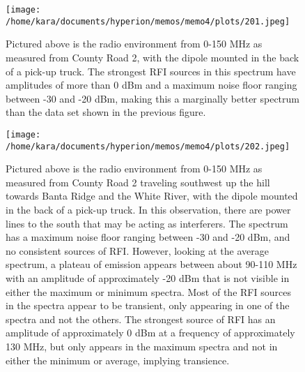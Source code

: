 \documentclass[11pt]{article}
\begin{document}
\begin{figure}[H]
    \begin{center}
    \texttt{[image: /home/kara/documents/hyperion/memos/memo4/plots/201.jpeg]}
    \end{center}
    \caption{
        Pictured above is the radio environment from 0-150 MHz as measured from 
        County Road 2, with the dipole mounted in the back of a pick-up truck.  
        The strongest RFI sources in this spectrum have amplitudes of more than 
        0 dBm and a maximum noise floor ranging between -30 and -20 dBm, making 
          this a marginally better spectrum than the data set shown in the 
          previous figure.
    }
    \label{fig:201}
\end{figure}
\begin{figure}[H]
    \begin{center}
    \texttt{[image: /home/kara/documents/hyperion/memos/memo4/plots/202.jpeg]}
    \end{center}
    \caption{
        Pictured above is the radio environment from 0-150 MHz as measured from 
        County Road 2 traveling southwest up the hill towards Banta Ridge and 
        the White River, with the dipole mounted in the back of a pick-up 
        truck.  In this observation, there are power lines to the south that 
        may be acting as interferers. The spectrum has a maximum noise floor 
        ranging between -30 and -20 dBm, and no consistent sources of RFI.  
        However, looking at the average spectrum, a plateau of emission appears 
        between about 90-110 MHz with an amplitude of approximately -20 dBm 
        that is not visible in either the maximum or minimum spectra.
        Most of the RFI sources in the spectra appear to be transient, only 
        appearing in one of the spectra and not the others.  The strongest 
        source of RFI has an amplitude of approximately 0 dBm at a frequency of 
        approximately 130 MHz, but only appears in the maximum spectra and not 
        in either the minimum or average, implying transience.
        }
        \label{fig:202}
\end{figure}
\end{document}
